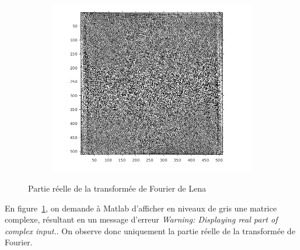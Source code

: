 \documentclass[12pt,a4paper,onecolumn]{article}
\begin{document}
\begin{figure}[H]
\begin{subfigure}[b]{\textwidth}
		\includegraphics[scale = 1, height = 0.3\textheight]{7_1}
	\end{subfigure}
	\caption{Partie réelle de la transformée de Fourier de Lena}
	\label{7_1}
\end{figure}

En figure~\ref{7_1}, on demande à Matlab d'afficher en niveaux de gris une matrice complexe, résultant en un message d'erreur \textit{Warning: Displaying real part of complex input.}. On observe donc uniquement la partie réelle de la transformée de Fourier.
\end{document}
